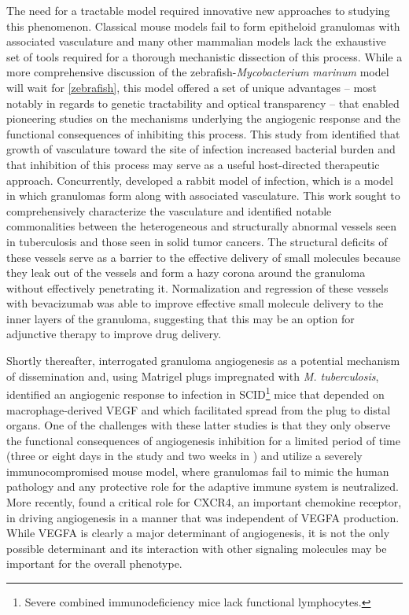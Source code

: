 The need for a tractable model required innovative new approaches to studying this phenomenon. Classical mouse models fail to form epitheloid granulomas with associated vasculature and many other mammalian models lack the exhaustive set of tools required for a thorough mechanistic dissection of this process. While a more comprehensive discussion of the zebrafish\hyp{}\textit{Mycobacterium marinum} model will wait for \autoref{zebrafish}, this model offered a set of unique advantages -- most notably in regards to genetic tractability and optical transparency -- that enabled pioneering studies on the mechanisms underlying the angiogenic response and the functional consequences of inhibiting this process. This study from \citet{Oehlers2015} identified that growth of vasculature toward the site of infection increased bacterial burden and that inhibition of this process may serve as a useful host\hyp{}directed therapeutic approach. Concurrently, \citet{Datta2015} developed a rabbit model of infection, which is a model in which granulomas form along with associated vasculature. This work sought to comprehensively characterize the vasculature and identified notable commonalities between the heterogeneous and structurally abnormal vessels seen in tuberculosis and those seen in solid tumor cancers. The structural deficits of these vessels serve as a barrier to the effective delivery of small molecules because they leak out of the vessels and form a hazy corona around the granuloma without effectively penetrating it. Normalization and regression of these vessels with bevacizumab was able to improve effective small molecule delivery to the inner layers of the granuloma, suggesting that this may be an option for adjunctive therapy to improve drug delivery. 

Shortly thereafter, \citet{Polena2016} interrogated granuloma angiogenesis as a potential mechanism of dissemination and, using Matrigel plugs impregnated with \textit{M. tuberculosis}, identified an angiogenic response to infection in SCID\footnote{Severe combined immunodeficiency mice lack functional lymphocytes.} mice that depended on macrophage\hyp{}derived VEGF and which facilitated spread from the plug to distal organs. One of the challenges with these latter studies is that they only observe the functional consequences of angiogenesis inhibition for a limited period of time (three or eight days in the \citet{Datta2015} study and two weeks in \citet{Polena2016}) and \citet{Polena2016} utilize a severely immunocompromised mouse model, where granulomas fail to mimic the human pathology and any protective role for the adaptive immune system is neutralized. More recently, \citet{Torraca2017} found a critical role for CXCR4, an important chemokine receptor, in driving angiogenesis in a manner that was independent of VEGFA production. While VEGFA is clearly a major determinant of angiogenesis, it is not the only possible determinant and its interaction with other signaling molecules may be important for the overall phenotype. 

